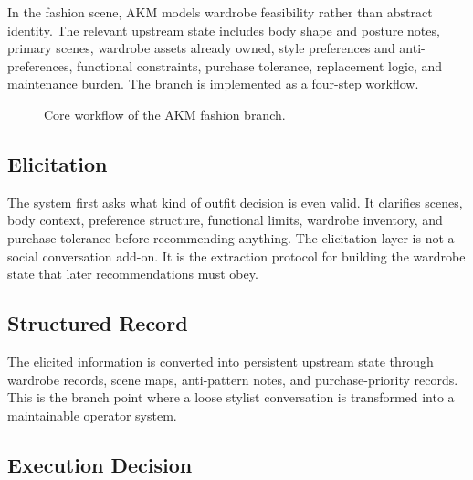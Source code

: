 \documentclass[11pt]{article}
\begin{document}
In the fashion scene, AKM models wardrobe feasibility rather than abstract identity. The relevant upstream state includes body shape and posture notes, primary scenes, wardrobe assets already owned, style preferences and anti-preferences, functional constraints, purchase tolerance, replacement logic, and maintenance burden. The branch is implemented as a four-step workflow.

\begin{figure}[htbp]
\centering
{}
\caption{Core workflow of the AKM fashion branch.}
\end{figure}

\subsection{Elicitation}

The system first asks what kind of outfit decision is even valid. It clarifies scenes, body context, preference structure, functional limits, wardrobe inventory, and purchase tolerance before recommending anything. The elicitation layer is not a social conversation add-on. It is the extraction protocol for building the wardrobe state that later recommendations must obey.

\subsection{Structured Record}

The elicited information is converted into persistent upstream state through wardrobe records, scene maps, anti-pattern notes, and purchase-priority records. This is the branch point where a loose stylist conversation is transformed into a maintainable operator system.

\subsection{Execution Decision}
\end{document}
